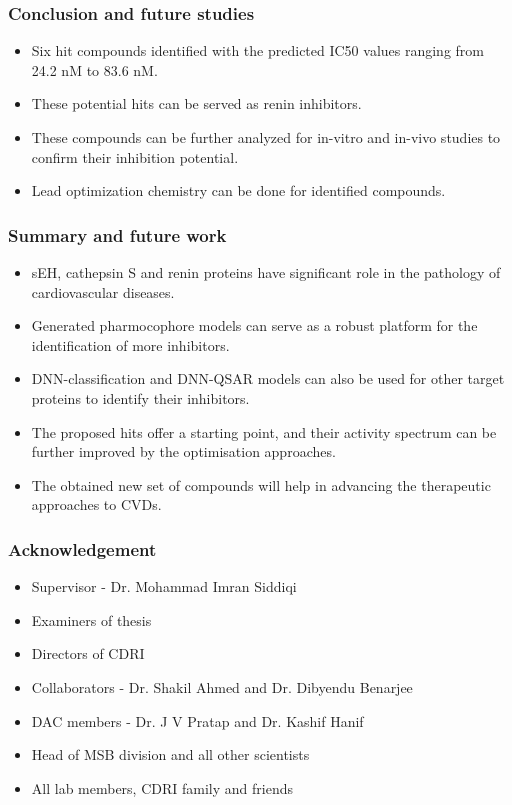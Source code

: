 \documentclass{beamer}
\begin{document}
\begin{frame}
\frametitle{\textbf{Conclusion and future studies}}
\begin{itemize}
\item Six hit compounds identified with the predicted IC50 values ranging from 24.2 nM to 83.6 nM.
\item These potential hits can be served as renin inhibitors.
\item These compounds can be further analyzed for in-vitro and in-vivo studies to confirm their inhibition potential.
\item Lead optimization chemistry can be done for identified compounds.
\end{itemize}
\end{frame}

\begin{frame}
\frametitle{\textbf{Summary and future work}}
\begin{itemize}
\item sEH, cathepsin S and renin proteins have significant role in the pathology of cardiovascular diseases.
\item Generated pharmocophore models can serve as a robust platform for the identification of more inhibitors.
\item DNN-classification and DNN-QSAR models can also be used for other target proteins to identify their inhibitors.
\item The proposed hits offer a starting point, and their activity spectrum can be further improved by the optimisation approaches.
\item The obtained new set of compounds will help in advancing the therapeutic approaches to CVDs.
\end{itemize}
\end{frame}


\begin{frame}
\frametitle{\textbf{Acknowledgement}}
\begin{itemize}
\item Supervisor - Dr. Mohammad Imran Siddiqi
\item Examiners of thesis
\item Directors of CDRI
\item Collaborators - Dr. Shakil Ahmed and Dr. Dibyendu Benarjee
\item DAC members - Dr. J V Pratap and Dr. Kashif Hanif
\item Head of MSB division and all other scientists
\item All lab members, CDRI family and friends
\end{itemize}
\end{frame}
\end{document}
